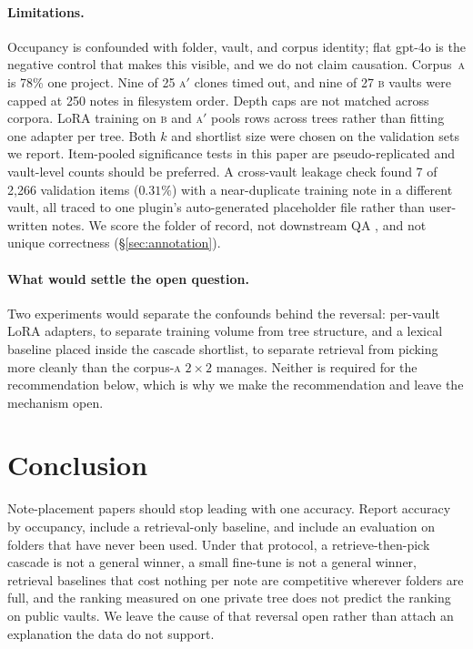 \documentclass[11pt]{article}
\newcommand{\corpA}{\textsc{a}}
\newcommand{\corpB}{\textsc{b}}
\newcommand{\corpAp}{\textsc{a}$'$}
\begin{document}
\paragraph{Limitations.}
Occupancy is confounded with folder, vault, and corpus identity; flat gpt-4o is the negative control that makes this visible, and we do not claim causation.
Corpus~\corpA{} is 78\% one project.
Nine of 25 \corpAp{} clones timed out, and nine of 27 \corpB{} vaults were capped at 250 notes in filesystem order.
Depth caps are not matched across corpora.
LoRA training on \corpB{} and \corpAp{} pools rows across trees rather than fitting one adapter per tree.
Both $k$ and shortlist size were chosen on the validation sets we report.
Item-pooled significance tests in this paper are pseudo-replicated and vault-level counts should be preferred.
A cross-vault leakage check found 7 of 2{,}266 validation items ($0.31\%$) with a near-duplicate training note in a different vault, all traced to one plugin's auto-generated placeholder file rather than user-written notes.
We score the folder of record, not downstream QA \citep{filesystem-memory}, and not unique correctness (\S\ref{sec:annotation}).

\paragraph{What would settle the open question.}
Two experiments would separate the confounds behind the reversal: per-vault LoRA adapters, to separate training volume from tree structure, and a lexical baseline placed inside the cascade shortlist, to separate retrieval from picking more cleanly than the corpus-\corpA{} $2\times2$ manages.
Neither is required for the recommendation below, which is why we make the recommendation and leave the mechanism open.

\section{Conclusion}

Note-placement papers should stop leading with one accuracy.
Report accuracy by occupancy, include a retrieval-only baseline, and include an evaluation on folders that have never been used.
Under that protocol, a retrieve-then-pick cascade is not a general winner, a small fine-tune is not a general winner, retrieval baselines that cost nothing per note are competitive wherever folders are full, and the ranking measured on one private tree does not predict the ranking on public vaults.
We leave the cause of that reversal open rather than attach an explanation the data do not support.
\end{document}
